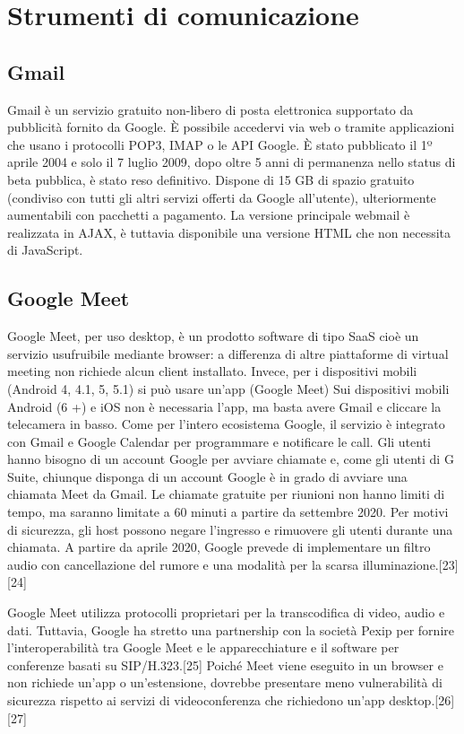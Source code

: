 \section{Strumenti di comunicazione}
\subsection{Gmail}
Gmail è un servizio gratuito non-libero di posta elettronica supportato da pubblicità fornito da Google. 
È possibile accedervi via web o tramite applicazioni che usano i protocolli POP3, IMAP o le API Google.
È stato pubblicato il 1º aprile 2004 e solo il 7 luglio 2009, dopo oltre 5 anni di permanenza nello status di beta pubblica, è stato reso definitivo.
Dispone di 15 GB di spazio gratuito (condiviso con tutti gli altri servizi offerti da Google all'utente), ulteriormente aumentabili con pacchetti a pagamento. 
La versione principale webmail è realizzata in AJAX, è tuttavia disponibile una versione HTML che non necessita di JavaScript.
\subsection{Google Meet}
Google Meet, per uso desktop, è un prodotto software di tipo SaaS cioè un servizio usufruibile mediante browser: a differenza di altre piattaforme di virtual meeting non richiede alcun client installato. 
Invece, per i dispositivi mobili (Android 4, 4.1, 5, 5.1) si può usare un'app (Google Meet)
Sui dispositivi mobili Android (6 +) e iOS non è necessaria l'app, ma basta avere Gmail e cliccare la telecamera in basso. 
Come per l'intero ecosistema Google, il servizio è integrato con Gmail e Google Calendar per programmare e notificare le call.
Gli utenti hanno bisogno di un account Google per avviare chiamate e, come gli utenti di G Suite, chiunque disponga di un account Google è in grado di avviare una chiamata Meet da Gmail.
Le chiamate gratuite per riunioni non hanno limiti di tempo, ma saranno limitate a 60 minuti a partire da settembre 2020. 
Per motivi di sicurezza, gli host possono negare l'ingresso e rimuovere gli utenti durante una chiamata.
A partire da aprile 2020, Google prevede di implementare un filtro audio con cancellazione del rumore e una modalità per la scarsa illuminazione.[23][24]

Google Meet utilizza protocolli proprietari per la transcodifica di video, audio e dati. Tuttavia, Google ha stretto una partnership con la società Pexip per fornire l'interoperabilità tra Google Meet e le apparecchiature e il software per conferenze basati su SIP/H.323.[25] Poiché Meet viene eseguito in un browser e non richiede un'app o un'estensione, dovrebbe presentare meno vulnerabilità di sicurezza rispetto ai servizi di videoconferenza che richiedono un'app desktop.[26][27]

